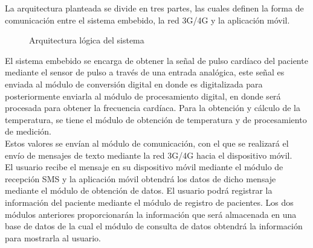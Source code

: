 La arquitectura planteada se divide en tres partes, las cuales definen la forma de comunicación entre el sistema embebido, la red 3G/4G y la aplicación móvil.\\

\begin{figure}[htbp!]
	\centering
	\caption{Arquitectura lógica del sistema}
	\label{fig:DisenoArquiLogica}
\end{figure}

El sistema embebido se encarga de obtener la señal de pulso cardíaco del paciente mediante el sensor de pulso a través de una entrada analógica, este señal es enviada al módulo de conversión digital en donde es digitalizada para posteriormente enviarla al módulo de procesamiento digital, en donde será procesada para obtener la frecuencia cardíaca. Para la obtención y cálculo de la temperatura, se tiene el módulo de obtención de temperatura y de procesamiento de medición. \\

Estos valores se envían al módulo de comunicación, con el que se realizará el envío de mensajes de texto mediante la red 3G/4G hacia el dispositivo móvil. \\

El usuario recibe el mensaje en su dispositivo móvil mediante el módulo de recepción SMS y la aplicación móvil obtendrá los datos de dicho mensaje mediante el módulo de obtención de datos. El usuario podrá registrar la información del paciente mediante el módulo de registro de pacientes. Los dos módulos anteriores proporcionarán la información que será almacenada en una base de datos de la cual el módulo de consulta de datos obtendrá la información para mostrarla al usuario.